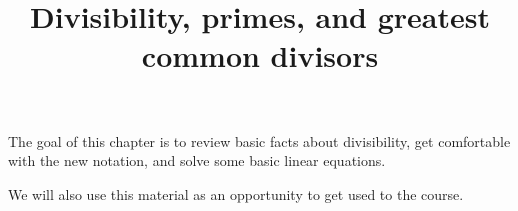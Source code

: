 \documentclass{ximera}
\title{Divisibility, primes, and greatest common divisors}
\begin{document}
\begin{abstract}
\end{abstract}
\maketitle



The goal of this chapter is to review basic facts about divisibility, get comfortable with the new notation, and solve some basic linear equations.

We will also use this material as an opportunity to get used to the course. 
 
\end{document}
